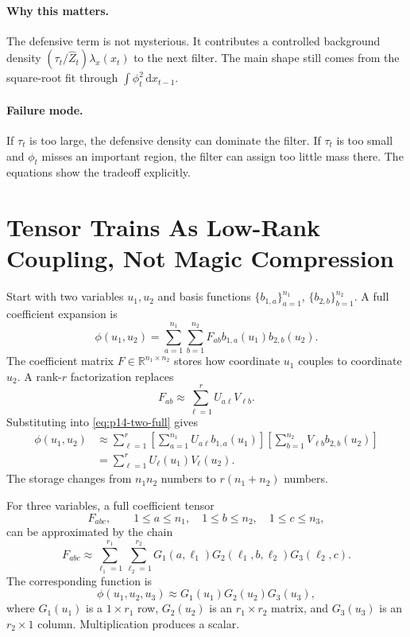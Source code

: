 \documentclass[11pt]{article}
\newcommand{\dd}{\mathrm{d}}
\newcommand{\R}{\mathbb{R}}
\renewcommand{\[}{\begin{equation}}
\renewcommand{\]}{\end{equation}}
\theoremstyle{definition}
\theoremstyle{remark}
\begin{document}
\paragraph{Why this matters.}
The defensive term is not mysterious.  It contributes a controlled background
density \((\tau_t/\widehat Z_t)\lambda_x(x_t)\) to the next filter.  The main
shape still comes from the square-root fit through
\(\int\phi_t^2\,\dd x_{t-1}\).

\paragraph{Failure mode.}
If \(\tau_t\) is too large, the defensive density can dominate the filter.  If
\(\tau_t\) is too small and \(\phi_t\) misses an important region, the filter
can assign too little mass there.  The equations show the tradeoff explicitly.

\section{Tensor Trains As Low-Rank Coupling, Not Magic Compression}

Start with two variables \(u_1,u_2\) and basis functions
\(\{b_{1,a}\}_{a=1}^{n_1}\), \(\{b_{2,b}\}_{b=1}^{n_2}\).  A full coefficient
expansion is
\[
  \phi(u_1,u_2)
  =
  \sum_{a=1}^{n_1}\sum_{b=1}^{n_2}
  F_{ab} b_{1,a}(u_1)b_{2,b}(u_2).
  \label{eq:p14-two-full}
\]
The coefficient matrix \(F\in\R^{n_1\times n_2}\) stores how coordinate
\(u_1\) couples to coordinate \(u_2\).  A rank-\(r\) factorization replaces
\[
  F_{ab}
  \approx
  \sum_{\ell=1}^r U_{a\ell}V_{\ell b}.
  \label{eq:p14-two-rank}
\]
Substituting into \eqref{eq:p14-two-full} gives
\[
\begin{aligned}
  \phi(u_1,u_2)
  &\approx
  \sum_{\ell=1}^r
  \left[\sum_{a=1}^{n_1}U_{a\ell}b_{1,a}(u_1)\right]
  \left[\sum_{b=1}^{n_2}V_{\ell b}b_{2,b}(u_2)\right] \\
  &=
  \sum_{\ell=1}^r U_\ell(u_1)V_\ell(u_2).
\end{aligned}
  \label{eq:p14-two-functional-rank}
\]
The storage changes from \(n_1n_2\) numbers to \(r(n_1+n_2)\) numbers.

For three variables, a full coefficient tensor
\[
  F_{abc},\qquad
  1\le a\le n_1,\quad 1\le b\le n_2,\quad 1\le c\le n_3,
\]
can be approximated by the chain
\[
  F_{abc}
  \approx
  \sum_{\ell_1=1}^{r_1}\sum_{\ell_2=1}^{r_2}
  G_1(a,\ell_1)G_2(\ell_1,b,\ell_2)G_3(\ell_2,c).
  \label{eq:p14-three-tt}
\]
The corresponding function is
\[
  \phi(u_1,u_2,u_3)
  \approx
  G_1(u_1)G_2(u_2)G_3(u_3),
  \label{eq:p14-three-functional}
\]
where \(G_1(u_1)\) is a \(1\times r_1\) row, \(G_2(u_2)\) is an
\(r_1\times r_2\) matrix, and \(G_3(u_3)\) is an \(r_2\times1\) column.
Multiplication produces a scalar.
\end{document}
